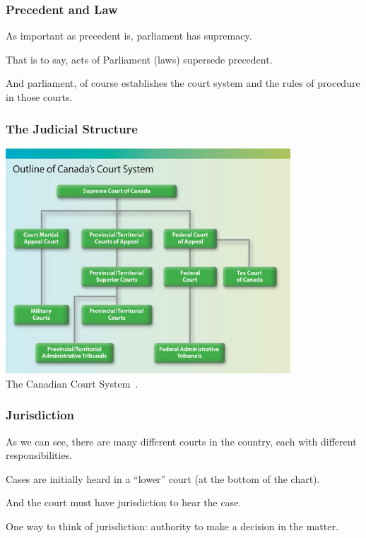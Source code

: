 \begin{frame}
\frametitle{Precedent and Law}

As important as precedent is, parliament has supremacy.

That is to say, acts of Parliament (laws) supersede precedent. 

And parliament, of course establishes the court system and the rules of procedure in those courts.

\end{frame}



\begin{frame}
\frametitle{The Judicial Structure}

\begin{center}
	\includegraphics[width=0.8\textwidth]{images/courts.jpg}\\
	The Canadian Court System~\cite{just07}.
\end{center}

\end{frame}



\begin{frame}
\frametitle{Jurisdiction}

As we can see, there are many different courts in the country, each with different responsibilities.

Cases are initially heard in a ``lower'' court (at the bottom of the chart).

And the court must have \alert{jurisdiction} to hear the case.

One way to think of jurisdiction: authority to make a decision in the matter.

\end{frame}



